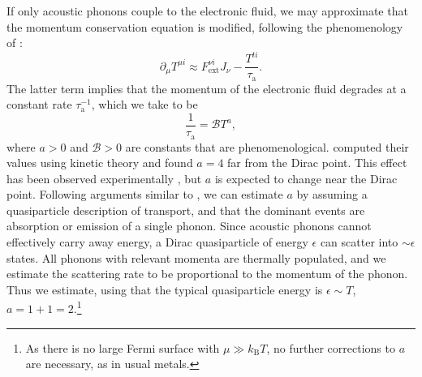 If only acoustic phonons couple to the electronic fluid, we may approximate that the momentum conservation equation is modified, following the phenomenology of \cite{hartnoll_theory_2007}: \begin{equation}
\partial_\mu T^{\mu i} \approx F^{\nu i}_{\mathrm{ext}} J_\nu - \frac{T^{ti}}{\tau_{\mathrm{a}}} .
\end{equation}
The latter term implies that the momentum of the electronic fluid degrades at a constant rate $\tau^{-1}_{\mathrm{a}}$, which we take to be \begin{equation}
\frac{1}{\tau_{\mathrm{a}}} = \mathcal{B} T^a,
\end{equation}where $a>0$ and $\mathcal{B}>0$ are constants that are phenomenological.  \cite{hwang_acoustic_2008} computed their values using kinetic theory and found $a=4$ far from the Dirac point.   This effect has been observed experimentally \cite{efetov_controlling_2010},  but $a$ is expected to change near the Dirac point.   Following arguments similar to \cite{ashcroft_solid_1976, hwang_acoustic_2008}, we can estimate $a$ by assuming a quasiparticle description of transport, and that the dominant events are absorption or emission of a single phonon.   Since acoustic phonons cannot effectively carry away energy, a Dirac quasiparticle of energy $\epsilon$ can scatter into $\sim \epsilon$ states.   All phonons with relevant momenta are thermally populated, and we estimate the scattering rate to be proportional to the momentum of the phonon.   Thus we estimate, using that the typical quasiparticle energy is $\epsilon \sim T$, $a=1+1=2$.\footnote{As there is no large Fermi surface with $\mu \gg k_{\mathrm{B}}T$, no further corrections to $a$ are necessary, as in usual metals.}

